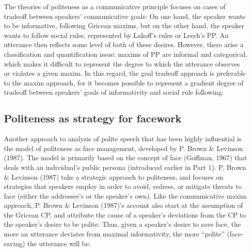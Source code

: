 \documentclass[oneside]{report}
\begin{document}
The theories of politeness as a communicative principle focuses on cases
of tradeoff between speakers' communicative goals: On one hand, the
speaker wants to be informative, following Gricean maxims, but on the
other hand, the speaker wants to follow social rules, represented by
Lakoff's rules or Leech's PP. An utterance then reflects some level of
both of these desires. However, there arise a classification and
quantification issue: maxims of PP are informal and categorical, which
makes it difficult to represent the degree to which the utterance
observes or violates a given maxim. In this regard, the goal tradeoff
approach is preferable to the maxim approach, for it becomes possible to
represent a gradient degree of tradeoff between speakers' goals of
informativity and social rule following.

\subsection{Politeness as strategy for
facework}\label{politeness-as-strategy-for-facework}

Another approach to analysis of polite speech that has been highly
influential is the model of politeness as face management, developed by
P. Brown \& Levinson (1987). The model is primarily based on the concept
of face (Goffman, 1967) that deals with an individual's public persona
(introduced earlier in Part 1). P. Brown \& Levinson (1987) take a
strategic approach to politeness, and focuses on strategies that
speakers employ in order to avoid, redress, or mitigate threats to face
(either the addressee's or the speaker's own). Like the communicative
maxim approach, P. Brown \& Levinson (1987)'s account also start at the
assumption of the Gricean CP, and attribute the cause of a speaker's
deviations from the CP to the speaker's desire to be polite. Thus, given
a speaker's desire to save face, the more an utterance deviates from
maximal informativity, the more ``polite'' (face-saving) the utterance
will be.
\end{document}
